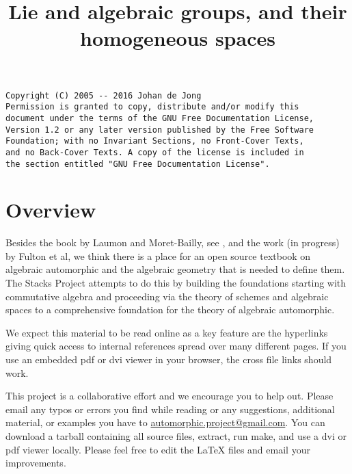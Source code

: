 

%

\newcommand{\TAG}{ZZZZ}

\title{Lie and algebraic groups, and their homogeneous spaces}


\maketitle

\label{section-phantom}

\begin{verbatim}
Copyright (C) 2005 -- 2016 Johan de Jong
Permission is granted to copy, distribute and/or modify this
document under the terms of the GNU Free Documentation License,
Version 1.2 or any later version published by the Free Software
Foundation; with no Invariant Sections, no Front-Cover Texts,
and no Back-Cover Texts. A copy of the license is included in
the section entitled "GNU Free Documentation License".
\end{verbatim}

\tableofcontents


\section{Overview}
\label{section-overview}

\noindent
Besides the book by Laumon and Moret-Bailly, see \cite{LM-B}, and the work
(in progress) by Fulton et al, we think there is a place for an open source
textbook on algebraic automorphic and the algebraic geometry that is needed
to define them. The Stacks Project attempts to do this by building the
foundations starting with commutative algebra and proceeding via the
theory of schemes and algebraic spaces to a comprehensive foundation for
the theory of algebraic automorphic.

\medskip\noindent
We expect this material to be read online as a key feature are the hyperlinks
giving quick access to internal references spread over many different pages.
If you use an embedded pdf or dvi viewer in your browser, the cross file
links should work.

\medskip\noindent
This project is a collaborative effort and we encourage you to help out.
Please email any typos or errors you find while reading or
any suggestions, additional material, or examples you have to
\href{mailto:automorphic.project@gmail.com}{automorphic.project@gmail.com}.
You can download a tarball containing all source files, extract,
run make, and use a dvi or pdf viewer locally. Please feel free to
edit the LaTeX files and email your improvements.


